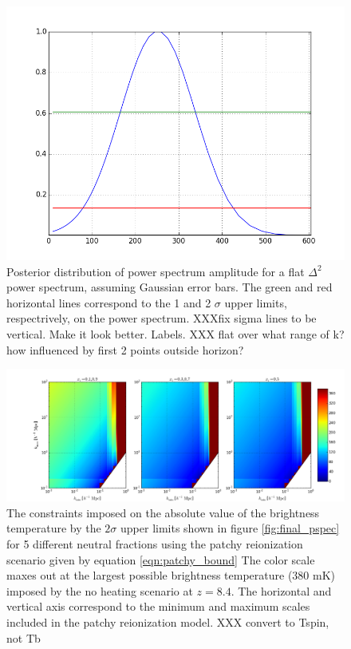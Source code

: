 \documentclass[twocolumn,numberedappendix]{emulateapj} \shorttitle{PSA64}
\begin{document}
\begin{figure}[t!]\centering
\includegraphics[width=\columnwidth]{plots/flat_k3pk_posterior.png}
\caption{Posterior distribution of power spectrum amplitude for a flat $\Delta^{2}$
power spectrum,
assuming Gaussian error bars. The green and red
horizontal lines correspond to the 1 and 2 $\sigma$ upper limits, respectrively,
on the power spectrum. XXXfix sigma lines to be vertical. Make it look better.
Labels.
XXX flat over what range of k?  how influenced by first 2 points outside horizon?
}
\label{fig:final_posterior}
\end{figure}

\begin{figure}[b!]\centering
\includegraphics[width=2\columnwidth]{plots/patchy_bound.png}
\caption{The constraints imposed on the absolute value of the brightness
temperature by the $2\sigma$ upper limits shown in figure \ref{fig:final_pspec}
for 5 different neutral fractions using the patchy reionization scenario given
by equation \ref{eqn:patchy_bound} The color scale maxes out at the largest
possible brightness temperature (380 mK) imposed by the no heating scenario at
$z=8.4$. The horizontal and vertical axis correspond to the minimum and maximum
scales included in the patchy reionization model.
XXX convert to Tspin, not Tb
}
\label{fig:patchy_bound}
\end{figure}
\end{document}
